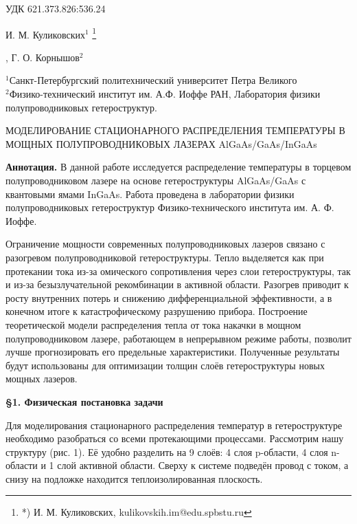 \documentclass[a4paper,12pt]{article}
\newcommand{\blfootnote}[1]{%
	\begingroup
	\renewcommand{\thefootnote}{}%
	\footnote{#1}%
	\addtocounter{footnote}{-1}%
	\endgroup
}
\begin{document}
	
	\noindent УДК 621.373.826:536.24
	
	\begin{flushright}
		И. М. Куликовских$^{1}$\blfootnote{*) И. М. Куликовских, kulikovskih.im@edu.spbstu.ru}, Г. О. Корнышов$^{2}$
	\end{flushright}
	
	
	\begin{flushright}
		$^{1}$Санкт-Петербургский политехнический университет Петра Великого\\
		$^{2}$Физико-технический институт им. А.Ф. Иоффе РАН, Лаборатория физики полупроводниковых гетероструктур. 
	\end{flushright}
	
	\vspace{12pt}
	
	\begin{center}
		МОДЕЛИРОВАНИЕ СТАЦИОНАРНОГО РАСПРЕДЕЛЕНИЯ ТЕМПЕРАТУРЫ В МОЩНЫХ ПОЛУПРОВОДНИКОВЫХ ЛАЗЕРАХ AlGaAs/GaAs/InGaAs		
	\end{center}
	
	\quad \textbf{Аннотация.} В данной работе исследуется распределение температуры в торцевом полупроводниковом лазере на основе гетероструктуры AlGaAs/GaAs с квантовыми ямами InGaAs. Работа проведена в лаборатории физики полупроводниковых гетероструктур Физико-технического института им. А. Ф. Иоффе.
	
	\quad Ограничение мощности современных полупроводниковых лазеров связано с разогревом полупроводниковой гетероструктуры. Тепло выделяется как при протекании тока из-за омического сопротивления через слои гетероструктуры, так и из-за безызлучательной рекомбинации в активной области. Разогрев приводит к росту внутренних потерь и снижению дифференциальной эффективности, а в конечном итоге к катастрофическому разрушению прибора. Построение теоретической модели распределения тепла от тока накачки в мощном полупроводниковом лазере, работающем в непрерывном режиме работы, позволит лучше прогнозировать его предельные характеристики. Полученные результаты будут использованы для оптимизации толщин слоёв гетероструктуры новых мощных лазеров. 
	
	
	\quad 	\textbf{ \S 1. Физическая постановка задачи}
	
	\quad Для моделирования стационарного распределения температур в гетероструктуре необходимо разобраться со всеми протекающими процессами. Рассмотрим нашу структуру (рис. 1). Её удобно разделить на 9 слоёв: 4 слоя p-области, 4 слоя n-области и 1 слой активной области. Сверху к системе подведён провод с током, а снизу на подложке находится теплоизолированная плоскость. 
	
\end{document}
